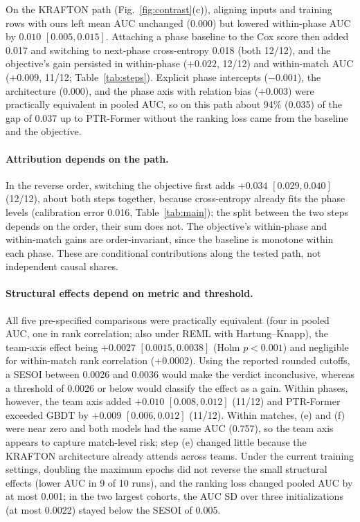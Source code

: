 \documentclass[sigconf,anonymous,nonacm]{acmart}
\begin{document}
On the KRAFTON path (Fig.~\ref{fig:contrast}(c)), aligning inputs and training rows with ours left mean AUC unchanged (0.000) but lowered within-phase AUC by $0.010$ $[0.005, 0.015]$.
Attaching a phase baseline to the Cox score then added 0.017 and switching to next-phase cross-entropy 0.018 (both 12/12), and the objective's gain persisted in within-phase ($+0.022$, 12/12) and within-match AUC ($+0.009$, 11/12; Table~\ref{tab:steps}).
Explicit phase intercepts ($-0.001$), the architecture (0.000), and the phase axis with relation bias ($+0.003$) were practically equivalent in pooled AUC, so on this path about 94\% (0.035) of the gap of 0.037 up to PTR-Former without the ranking loss came from the baseline and the objective.

\paragraph{Attribution depends on the path.}
In the reverse order, switching the objective first adds $+0.034$ $[0.029, 0.040]$ (12/12), about both steps together, because cross-entropy already fits the phase levels (calibration error 0.016, Table~\ref{tab:main}); the split between the two steps depends on the order, their sum does not. The objective's within-phase and within-match gains are order-invariant, since the baseline is monotone within each phase. These are conditional contributions along the tested path, not independent causal shares.


\paragraph{Structural effects depend on metric and threshold.}
All five pre-specified comparisons were practically equivalent (four in pooled AUC, one in rank correlation; also under REML with Hartung--Knapp), the team-axis effect being $+0.0027$ $[0.0015, 0.0038]$ (Holm $p<0.001$) and negligible for within-match rank correlation ($+0.0002$). Using the reported rounded cutoffs, a SESOI between 0.0026 and 0.0036 would make the verdict inconclusive, whereas a threshold of 0.0026 or below would classify the effect as a gain.
Within phases, however, the team axis added $+0.010$ $[0.008, 0.012]$ (11/12) and PTR-Former exceeded GBDT by $+0.009$ $[0.006, 0.012]$ (11/12).
Within matches, (e) and (f) were near zero and both models had the same AUC (0.757), so the team axis appears to capture match-level risk; step (e) changed little because the KRAFTON architecture already attends across teams.
Under the current training settings, doubling the maximum epochs did not reverse the small structural effects (lower AUC in 9 of 10 runs), and the ranking loss changed pooled AUC by at most 0.001; in the two largest cohorts, the AUC SD over three initializations (at most 0.0022) stayed below the SESOI of 0.005.
\end{document}
